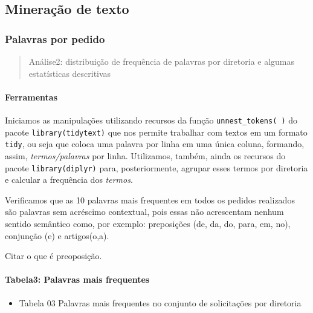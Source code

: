 \documentclass[]{article}
\providecommand{\tightlist}{%
  \setlength{\itemsep}{0pt}\setlength{\parskip}{0pt}}
\let\oldparagraph\paragraph
\renewcommand{\paragraph}[1]{\oldparagraph{#1}\mbox{}}
\begin{document}
\subsection{Mineração de texto}\label{mineracao-de-texto}

\subsubsection{Palavras por pedido}\label{palavras-por-pedido}

\begin{quote}
Análise2: distribuição de frequência de palavras por diretoria e algumas
estatísticas descritivas
\end{quote}

\paragraph{Ferramentas}\label{ferramentas}

Iniciamos as manipulações utilizando recursos da função
\texttt{unnest\_tokens(\ )} do pacote \texttt{library(tidytext)} que nos
permite trabalhar com textos em um formato \texttt{tidy}, ou seja que
coloca uma palavra por linha em uma única coluna, formando, assim,
\emph{termos/palavras} por linha. Utilizamos, também, ainda os recursos
do pacote \texttt{library(diplyr)} para, posteriormente, agrupar esses
termos por diretoria e calcular a frequência dos \emph{termos}.

Verificamos que as 10 palavras mais frequentes em todos os pedidos
realizados são palavras sem acréscimo contextual, pois essas não
acrescentam nenhum sentido semântico como, por exemplo: preposições (de,
da, do, para, em, no), conjunção (e) e artigos(o,a).

Citar o que é preoposição.

\paragraph{Tabela3: Palavras mais
frequentes}\label{tabela3-palavras-mais-frequentes}

\begin{itemize}
\tightlist
\item
  Tabela 03 Palavras mais frequentes no conjunto de solicitações por
  diretoria
\end{itemize}
\end{document}
